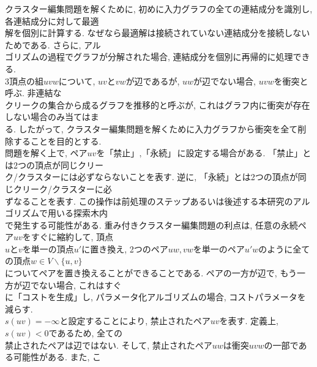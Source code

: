\documentclass[10.5,a4paper,titlepage]{bxjsarticle}
\begin{document}
クラスター編集問題を解くために, 初めに入力グラフの全ての連結成分を識別し, 各連結成分に対して最適\\

解を個別に計算する. なぜなら最適解は接続されていない連結成分を接続しないためである.
さらに, アル\\

ゴリズムの過程でグラフが分解された場合, 連結成分を個別に再帰的に処理できる. \\

3頂点の組$uvw$について, $uv$と$vw$が辺であるが, $uw$が辺でない場合, $uvw$を$\textbf{衝突}$と呼ぶ. 非連結な\\

クリークの集合から成るグラフを$\textbf{推移的}$と呼ぶが, これはグラフ内に衝突が存在しない場合のみ当てはま\\

る.
したがって, クラスター編集問題を解くために入力グラフから衝突を全て削除することを目的とする.\\


問題を解く上で, ペア$uv$を$\textbf{「禁止」}, \textbf{「永続」}$に設定する場合がある.
「禁止」とは2つの頂点が同じクリー\\

ク/クラスターには必ずならないことを表す. 逆に, 「永続」とは2つの頂点が同じクリーク/クラスターに必\\

ずなることを表す.
この操作は前処理のステップあるいは後述する本研究のアルゴリズムで用いる探索木内\\

で発生する可能性がある.
重み付きクラスター編集問題の利点は, 任意の永続ペア$uv$をすぐに縮約して, 頂点\\

$u$と$v$を単一の頂点$u'$に置き換え, 2つのペア$uw, vw$を単一のペア$u'w$のように全ての頂点$w \in V \backslash \{u,v\}$\\

についてペアを置き換えることができることである.
ペアの一方が辺で, もう一方が辺でない場合, これはすぐ\\

に「コストを生成」し, パラメータ化アルゴリズムの場合, コストパラメータを減らす. \\

$s(uv)=-\infty$と設定することにより, 禁止されたペア$uv$を表す.
定義上, $s(uv) < 0$であるため, 全ての\\

禁止されたペアは辺ではない.
そして, 禁止されたペア$uw$は衝突$uvw$の一部である可能性がある.
また, こ\\
\end{document}

